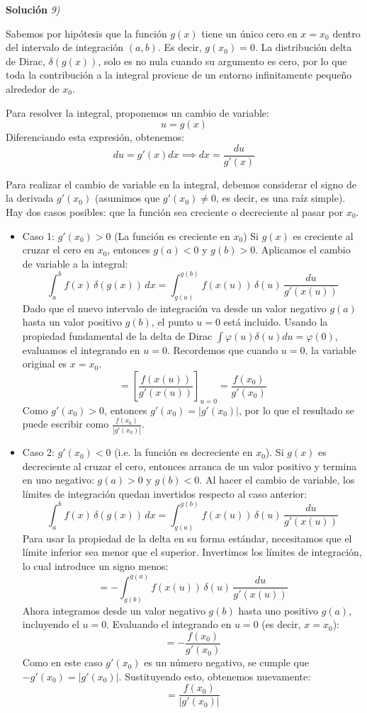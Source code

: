 \documentclass[11pt,spanish]{article}
\begin{document}
\vspace{0.5cm}
{\bf Soluci\'on }{\em 9)}
\vspace{0.5cm}

Sabemos por hipótesis que la función $g(x)$ tiene un único cero en $x = x_0$ dentro del intervalo de integración $(a, b)$. Es decir, $g(x_0) = 0$. La distribución delta de Dirac, $\delta(g(x))$, solo es no nula cuando su argumento es cero, por lo que toda la contribución a la integral proviene de un entorno infinitamente pequeño alrededor de $x_0$.

Para resolver la integral, proponemos un cambio de variable:
$$u = g(x)$$
Diferenciando esta expresión, obtenemos:
$$du = g'(x) dx \implies dx = \frac{du}{g'(x)}$$

Para realizar el cambio de variable en la integral, debemos considerar el signo de la derivada $g'(x_0)$ (asumimos que $g'(x_0) \neq 0$, es decir, es una raíz simple). Hay dos casos posibles: que la función sea creciente o decreciente al pasar por $x_0$.

\begin{itemize}
\item Caso 1: $g'(x_0) > 0$ (La función es creciente en $x_0$)
Si $g(x)$ es creciente al cruzar el cero en $x_0$, entonces $g(a) < 0$ y $g(b) > 0$.
Aplicamos el cambio de variable a la integral:
$$\int_a^b f(x)\,\delta(g(x))\,dx = \int_{g(a)}^{g(b)} f(x(u))\,\delta(u)\,\frac{du}{g'(x(u))}$$
Dado que el nuevo intervalo de integración va desde un valor negativo $g(a)$ hasta un valor positivo $g(b)$, el punto $u=0$ está incluido. Usando la propiedad fundamental de la delta de Dirac $\int \varphi(u)\delta(u)du = \varphi(0)$, evaluamos el integrando en $u=0$.
Recordemos que cuando $u=0$, la variable original es $x=x_0$.
$$= \left[ \frac{f(x(u))}{g'(x(u))} \right]_{u=0} = \frac{f(x_0)}{g'(x_0)}$$
Como $g'(x_0) > 0$, entonces $g'(x_0) = |g'(x_0)|$, por lo que el resultado se puede escribir como $\frac{f(x_0)}{|g'(x_0)|}$.

\item Caso 2: $g'(x_0) < 0$ (i.e. la función es decreciente en $x_0$).
Si $g(x)$ es decreciente al cruzar el cero, entonces arranca de un valor positivo y termina en uno negativo: $g(a) > 0$ y $g(b) < 0$.
Al hacer el cambio de variable, los límites de integración quedan invertidos respecto al caso anterior:
$$\int_a^b f(x)\,\delta(g(x))\,dx = \int_{g(a)}^{g(b)} f(x(u))\,\delta(u)\,\frac{du}{g'(x(u))}$$
Para usar la propiedad de la delta en su forma estándar, necesitamos que el límite inferior sea menor que el superior. Invertimos los límites de integración, lo cual introduce un signo menos:
$$= -\int_{g(b)}^{g(a)} f(x(u))\,\delta(u)\,\frac{du}{g'(x(u))}$$
Ahora integramos desde un valor negativo $g(b)$ hasta uno positivo $g(a)$, incluyendo el $u=0$. Evaluando el integrando en $u=0$ (es decir, $x=x_0$):
$$= -\frac{f(x_0)}{g'(x_0)}$$
Como en este caso $g'(x_0)$ es un número negativo, se cumple que $-g'(x_0) = |g'(x_0)|$. Sustituyendo esto, obtenemos nuevamente:
$$= \frac{f(x_0)}{|g'(x_0)|}$$
\end{itemize}
\end{document}
